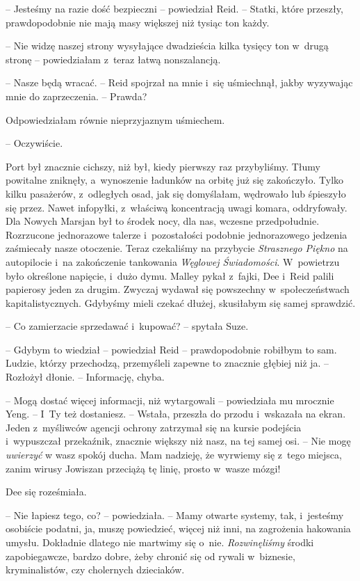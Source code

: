 \documentclass[oneside,polish,11pt,sfheadings]{mwbk}
\begin{document}
-- Jesteśmy na razie dość bezpieczni -- powiedział Reid. -- Statki, które
przeszły, prawdopodobnie nie mają masy większej niż tysiąc ton każdy.

-- Nie widzę naszej strony wysyłające dwadzieścia kilka tysięcy ton w~drugą stronę -- powiedziałam z~teraz łatwą nonszalancją.

-- Nasze będą wracać. -- Reid spojrzał na mnie i~się uśmiechnął, jakby
wyzywając mnie do zaprzeczenia. -- Prawda?

Odpowiedziałam równie nieprzyjaznym uśmiechem. 

-- Oczywiście.

Port był znacznie cichszy, niż był, kiedy pierwszy raz przybyliśmy.
Tłumy powitalne zniknęły, a~wynoszenie ładunków na orbitę już się
zakończyło. Tylko kilku pasażerów, z~odległych osad, jak się domyślałam,
wędrowało lub śpieszyło się przez. Nawet infopyłki, z~właściwą
koncentracją uwagi komara, oddryfowały. Dla Nowych Marsjan był to środek
nocy, dla nas, wczesne przedpołudnie. Rozrzucone jednorazowe talerze i~pozostałości podobnie jednorazowego jedzenia zaśmiecały nasze otoczenie.
Teraz czekaliśmy na przybycie \textit{Strasznego Piękno} na autopilocie i~na zakończenie tankowania \textit{Węglowej Świadomości}. W~powietrzu było
określone napięcie, i~dużo dymu. Malley pykał z~fajki, Dee i~Reid palili
papierosy jeden za drugim. Zwyczaj wydawał się powszechny w~społeczeństwach kapitalistycznych. Gdybyśmy mieli czekać dłużej,
skusiłabym się samej sprawdzić.

-- Co zamierzacie sprzedawać i~kupować? -- spytała Suze.

-- Gdybym to wiedział -- powiedział Reid -- prawdopodobnie robiłbym to sam.
Ludzie, którzy przechodzą, przemyśleli zapewne to znacznie głębiej niż
ja. -- Rozłożył dłonie. -- Informację, chyba.

-- Mogą dostać więcej informacji, niż wytargowali -- powiedziała mu
mrocznie Yeng. -- I~Ty też dostaniesz. -- Wstała, przeszła do przodu i~wskazała na ekran. Jeden z~myśliwców agencji ochrony zatrzymał się na
kursie podejścia i~wypuszczał przekaźnik, znacznie większy niż nasz, na
tej samej osi. -- Nie mogę \textit{uwierzyć }w wasz spokój ducha. Mam
nadzieję, że wyrwiemy się z~tego miejsca, zanim wirusy Jowiszan
przeciążą tę linię, prosto w~wasze mózgi!

Dee się roześmiała.

-- Nie łapiesz tego, co? -- powiedziała. -- Mamy otwarte systemy, tak, i~jesteśmy osobiście podatni, ja, muszę powiedzieć, więcej niż inni, na
zagrożenia hakowania umysłu. Dokładnie dlatego nie martwimy się o~nie.
\textit{Rozwinęliśmy} środki zapobiegawcze, bardzo dobre, żeby chronić się
od rywali w~biznesie, kryminalistów, czy cholernych dzieciaków.
\end{document}
